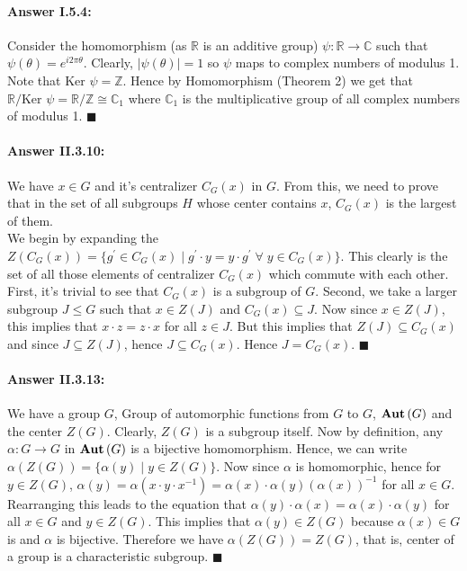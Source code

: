 \documentclass{article}
\theoremstyle{definition}
\theoremstyle{remark}
\theoremstyle{definition}
\theoremstyle{definition}
\newenvironment{customproof}[1]{\paragraph{Answer #1:}}{\hfill\ensuremath{\blacksquare}}
\newcommand{\abs}[1]{\left\vert #1\right\vert}
\newcommand{\inv}[1]{#1^{-1}}
\newcommand{\kernel}[0]{\text{Ker }}
\newcommand{\isomorph}{\cong}
\newcommand{\Auto}[1]{\text{\textbf{Aut}}\left(#1\right)}
\begin{document}
\hrulefill
\begin{customproof}{I.5.4}
	Consider the homomorphism (as $ \mathbb{R} $ is an additive group) $ \psi : \mathbb{R} \to \mathbb{C} $ such that $ \psi(\theta) = e^{i2\pi \theta} $. Clearly, $ \abs{\psi(\theta)} = 1$ so $ \psi $ maps to complex numbers of modulus 1. Note that $ \kernel \psi = \mathbb{Z} $. Hence by Homomorphism (Theorem 2) we get that $ \mathbb{R}/\kernel \psi = \mathbb{R}/\mathbb{Z} \isomorph \mathbb{C}_1 $ where $ \mathbb{C}_1 $ is the multiplicative group of all complex numbers of modulus 1.
\end{customproof}

\hrulefill
\newpage
\begin{customproof}{II.3.10}
	We have $ x\in G $ and it's centralizer $ C_G(x) $ in $ G $. From this, we need to prove that in the set of all subgroups $ H $ whose center contains $ x $, $ C_G(x) $ is the largest of them.\\
	We begin by expanding the $ Z(C_G(x)) = \{g^\prime \in C_G(x)\;\vert\; g^\prime\cdot y = y\cdot g^\prime \;\forall\;y\in C_G(x)\}$. This clearly is the set of all those elements of centralizer $ C_G(x) $ which commute with each other. First, it's trivial to see that $ C_G(x) $ is a subgroup of $ G $. Second, we take a larger subgroup $ J\le G $ such that $ x\in Z(J) $ and $ C_G(x) \subseteq J $. Now since $ x\in Z(J) $, this implies that $ x\cdot z = z\cdot x $ for all $ z\in J $. But this implies that $ Z(J) \subseteq C_G(x) $ and since $ J\subseteq Z(J) $, hence $ J\subseteq C_G(x) $. Hence $ J= C_G(x) $. 
\end{customproof}

\hrulefill
\begin{customproof}{II.3.13}
	We have a group $ G $, Group of automorphic functions from $ G $ to $ G $, $ \Auto{G} $ and the center $ Z(G) $. Clearly, $ Z(G) $ is a subgroup itself. Now by definition, any $ \alpha : G\to G $ in $ \Auto{G} $ is a bijective homomorphism. Hence, we can write $ \alpha(Z(G)) = \{\alpha(y)\;\vert\; y\in Z(G)\}$. Now since $ \alpha $ is homomorphic, hence for $ y\in Z(G) $, $ \alpha (y) = \alpha(x\cdot y\cdot\inv{x}) = \alpha(x) \cdot \alpha(y) \inv{(\alpha(x))}$ for all $ x\in G $. Rearranging this leads to the equation that $ \alpha(y)\cdot \alpha(x) = \alpha(x) \cdot \alpha(y) $ for all $ x\in G $ and $ y\in Z(G) $. This implies that $ \alpha(y)\in Z(G) $ because $ \alpha(x) \in G $ is and $ \alpha  $ is bijective. Therefore we have $ \alpha(Z(G)) = Z(G) $, that is, center of a group is a characteristic subgroup.
\end{customproof}
\end{document}
